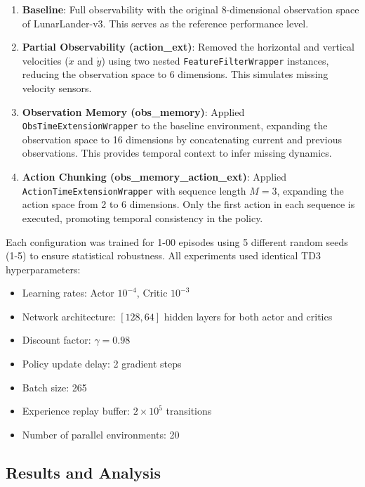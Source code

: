 \documentclass[12pt, a4paper]{article}
\begin{document}
\begin{enumerate}
	\item \textbf{Baseline}: Full observability with the original 8-dimensional observation space of LunarLander-v3. This serves as the reference performance level.
	
	\item \textbf{Partial Observability (action\_ext)}: Removed the horizontal and vertical velocities ($\dot{x}$ and $\dot{y}$) using two nested \texttt{FeatureFilterWrapper} instances, reducing the observation space to 6 dimensions. This simulates missing velocity sensors.
	
	\item \textbf{Observation Memory (obs\_memory)}: Applied \texttt{ObsTimeExtensionWrapper} to the baseline environment, expanding the observation space to 16 dimensions by concatenating current and previous observations. This provides temporal context to infer missing dynamics.
	
	\item \textbf{Action Chunking (obs\_memory\_action\_ext)}: Applied \texttt{ActionTimeExtensionWrapper} with sequence length $M=3$, expanding the action space from 2 to 6 dimensions. Only the first action in each sequence is executed, promoting temporal consistency in the policy.
\end{enumerate}

Each configuration was trained for 1-00 episodes using 5 different random seeds (1-5) to ensure statistical robustness. All experiments used identical TD3 hyperparameters:
\begin{itemize}
	\item Learning rates: Actor $10^{-4}$, Critic $10^{-3}$
	\item Network architecture: $[128, 64]$ hidden layers for both actor and critics
	\item Discount factor: $\gamma = 0.98$
	\item Policy update delay: 2 gradient steps
	\item Batch size: 265
	\item Experience replay buffer: $2 \times 10^5$ transitions
	\item Number of parallel environments: 20
\end{itemize}

\subsection{Results and Analysis}
\end{document}
